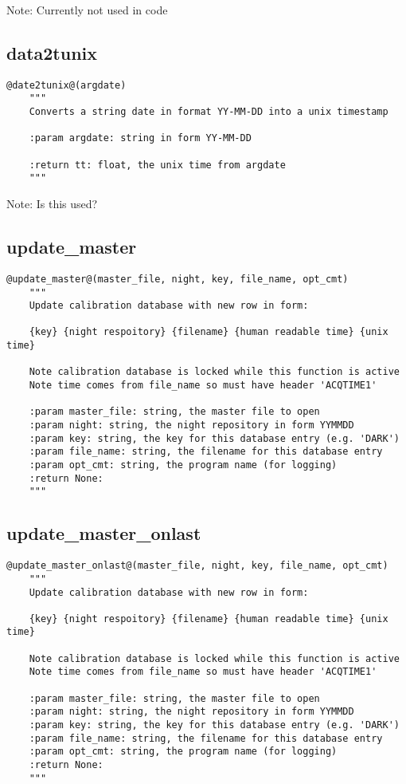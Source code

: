 \noindent Note: Currently not used in code \\

\subsection{data2tunix}
\begin{lstlisting}[style=pythonstyle]
@date2tunix@(argdate)
    """
    Converts a string date in format YY-MM-DD into a unix timestamp

    :param argdate: string in form YY-MM-DD
    
    :return tt: float, the unix time from argdate
    """
\end{lstlisting}

\noindent Note: Is this used? \\

\subsection{update\_master}
\begin{lstlisting}[style=pythonstyle]
@update_master@(master_file, night, key, file_name, opt_cmt)
    """
    Update calibration database with new row in form:

    {key} {night respoitory} {filename} {human readable time} {unix time}
    
    Note calibration database is locked while this function is active
    Note time comes from file_name so must have header 'ACQTIME1'

    :param master_file: string, the master file to open
    :param night: string, the night repository in form YYMMDD
    :param key: string, the key for this database entry (e.g. 'DARK')
    :param file_name: string, the filename for this database entry
    :param opt_cmt: string, the program name (for logging)
    :return None:
    """
\end{lstlisting}

\subsection{update\_master\_onlast}
\begin{lstlisting}[style=pythonstyle]
@update_master_onlast@(master_file, night, key, file_name, opt_cmt)
    """
    Update calibration database with new row in form:

    {key} {night respoitory} {filename} {human readable time} {unix time}
    
    Note calibration database is locked while this function is active
    Note time comes from file_name so must have header 'ACQTIME1'

    :param master_file: string, the master file to open
    :param night: string, the night repository in form YYMMDD
    :param key: string, the key for this database entry (e.g. 'DARK')
    :param file_name: string, the filename for this database entry
    :param opt_cmt: string, the program name (for logging)
    :return None:
    """
\end{lstlisting}

